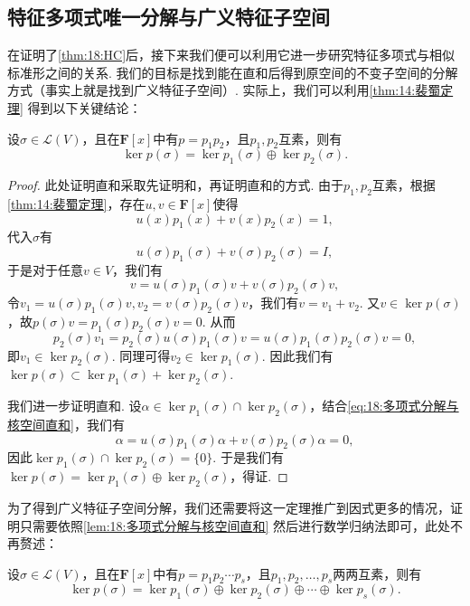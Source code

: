 \subsection{特征多项式唯一分解与广义特征子空间}

在证明了\autoref{thm:18:HC}后，接下来我们便可以利用它进一步研究特征多项式与相似标准形之间的关系. 我们的目标是找到能在直和后得到原空间的不变子空间的分解方式（事实上就是找到广义特征子空间）. 实际上，我们可以利用\autoref{thm:14:裴蜀定理} 得到以下关键结论：
\begin{lemma} \label{lem:18:多项式分解与核空间直和}
    设$\sigma\in \mathcal{L}(V)$，且在$\mathbf{F}[x]$中有$p=p_1p_2$，且$p_1,p_2$互素，则有
    \[\ker p(\sigma)=\ker p_1(\sigma)\oplus\ker p_2(\sigma).\]
\end{lemma}

\begin{proof}
    此处证明直和采取先证明和，再证明直和的方式. 由于$p_1,p_2$互素，根据\autoref{thm:14:裴蜀定理}，存在$u,v\in\mathbf{F}[x]$使得
    \[u(x)p_1(x)+v(x)p_2(x)=1,\]
    代入$\sigma$有
    \[u(\sigma)p_1(\sigma)+v(\sigma)p_2(\sigma)=I,\]
    于是对于任意$v\in V$，我们有
    \begin{equation} \label{eq:18:多项式分解与核空间直和}
        v=u(\sigma)p_1(\sigma)v+v(\sigma)p_2(\sigma)v,
    \end{equation}
    令$v_1=u(\sigma)p_1(\sigma)v,v_2=v(\sigma)p_2(\sigma)v$，我们有$v=v_1+v_2$. 又$v\in \ker p(\sigma)$，故$p(\sigma)v=p_1(\sigma)p_2(\sigma)v=0$. 从而
    \[p_2(\sigma)v_1=p_2(\sigma)u(\sigma)p_1(\sigma)v=u(\sigma)p_1(\sigma)p_2(\sigma)v=0,\]
    即$v_1\in \ker p_2(\sigma)$. 同理可得$v_2\in \ker p_1(\sigma)$. 因此我们有$\ker p(\sigma)\subset \ker p_1(\sigma)+\ker p_2(\sigma)$.

    我们进一步证明直和. 设$\alpha\in \ker p_1(\sigma)\cap \ker p_2(\sigma)$，结合\autoref{eq:18:多项式分解与核空间直和}，我们有
    \[\alpha=u(\sigma)p_1(\sigma)\alpha+v(\sigma)p_2(\sigma)\alpha=0,\]
    因此$\ker p_1(\sigma)\cap \ker p_2(\sigma)=\{0\}$. 于是我们有$\ker p(\sigma)=\ker p_1(\sigma)\oplus\ker p_2(\sigma)$，得证.
\end{proof}

为了得到广义特征子空间分解，我们还需要将这一定理推广到因式更多的情况，证明只需要依照\autoref{lem:18:多项式分解与核空间直和} 然后进行数学归纳法即可，此处不再赘述：
\begin{corollary} \label{cor:18:多项式分解与核空间直和2}
    设$\sigma\in \mathcal{L}(V)$，且在$\mathbf{F}[x]$中有$p=p_1p_2\cdots p_s$，且$p_1,p_2,\ldots,p_s$两两互素，则有\[\ker p(\sigma)=\ker p_1(\sigma)\oplus\ker p_2(\sigma)\oplus\cdots\oplus\ker p_s(\sigma).\]
\end{corollary}

